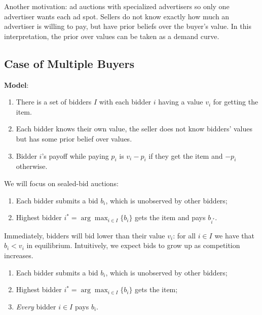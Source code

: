 \documentclass[dvipsnames]{article}
\theoremstyle{definition}
\theoremstyle{remark}
\newenvironment{mech}[1]{\begin{tcolorbox}[colback=red!5!white,colframe=red!75!black,title={#1}]}{\end{tcolorbox}}
\begin{document}
Another motivation: ad auctions with specialized advertisers so only one advertiser wants each ad spot. Sellers do not know exactly how much an advertiser is willing to pay, but have prior beliefs over the buyer's value. In this interpretation, the prior over values can be taken as a demand curve. 

\subsection{Case of Multiple Buyers}

\textbf{Model}: 
\begin{enumerate}
	\item There is a set of bidders $I$ with each bidder $i$ having a value $v_i$ for getting the item. 
	\item Each bidder knows their own value, the seller does not know bidders' values but has some prior belief over values.
	\item Bidder $i$'s payoff while paying $p_i$ is $v_i - p_i$ if they get the item and $-p_i$ otherwise.
\end{enumerate}

We will focus on sealed-bid auctions:

\begin{mech}{First-Price Auction}
	\begin{enumerate}
		\item Each bidder submits a bid $b_i$, which is unobserved by other bidders;
		\item Highest bidder $i^* = \arg\max_{i \in I}\{b_i\}$ gets the item and pays $b_{i^*}$.
	\end{enumerate}
\end{mech}

Immediately, bidders will bid lower than their value $v_i$: for all $i \in I$ we have that $b_i < v_i$ in equilibrium. Intuitively, we expect bids to grow up as competition increases.

\begin{mech}{All-Pay Auction}
	\begin{enumerate}
		\item Each bidder submits a bid $b_i$, which is unobserved by other bidders;
		\item Highest bidder $i^* = \arg\max_{i \in I}\{b_i\}$ gets the item;
		\item \textit{Every} bidder $i \in I$ pays $b_i$.
	\end{enumerate}
\end{mech}
\end{document}

